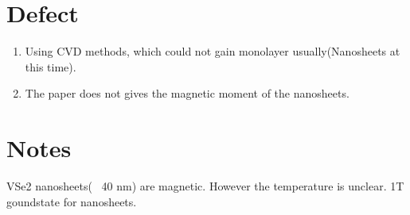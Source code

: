 \section{Defect}

\begin{enumerate}
    \item Using CVD methods, which could not gain monolayer usually(Nanosheets at this time).
    \item The paper does not gives the magnetic moment of the nanosheets.
\end{enumerate}

\section{Notes}
VSe2 nanosheets(~ 40 nm) are magnetic. However the temperature is unclear. 1T goundstate for nanosheets.